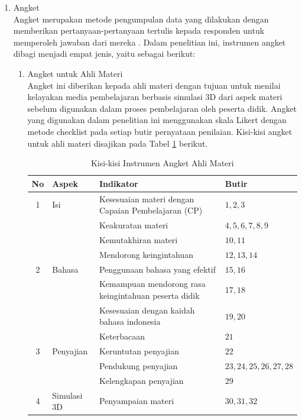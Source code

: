 \begin{enumerate}
\begin{enumerate}
        \item Angket\\
        \hspace*{1cm}Angket merupakan metode pengumpulan data yang dilakukan dengan memberikan pertanyaan-pertanyaan tertulis kepada responden untuk memperoleh jawaban dari mereka \citep{sugiyono2018}. Dalam penelitian ini, instrumen angket dibagi menjadi empat jenis, yaitu sebagai berikut:
        \begin{enumerate}
            \item Angket untuk Ahli Materi\\
            \hspace*{1cm}Angket ini diberikan kepada ahli materi dengan tujuan untuk menilai kelayakan media pembelajaran berbasis simulasi 3D dari aspek materi sebelum digunakan dalam proses pembelajaran oleh peserta didik. Angket yang digunakan dalam penelitian ini menggunakan skala Likert dengan metode checklist pada setiap butir pernyataan penilaian. Kisi-kisi angket untuk ahli materi disajikan pada Tabel \ref{kisiahlimateri} berikut.
            \begin{table}[H]
                \centering
                \caption{Kisi-kisi Instrumen Angket Ahli Materi}
                \label{kisiahlimateri}
                \begin{tabular}{|c|p{2.5cm}|p{6cm}|p{3.5cm}|}
                    \hline
                    \textbf{No} & \textbf{Aspek} & \textbf{Indikator} & \textbf{Butir}\\
                    \hline
                    1 & Isi & Kesesuaian materi dengan Capaian Pembelajaran (CP) & \(1,2,3\)\\
                    & & Keakuratan materi & \(4,5,6,7,8,9\)\\
                    & & Kemutakhiran materi & \(10,11\)\\
                    & & Mendorong keingintahuan & \(12,13,14\)\\
                    \hline
                    2 & Bahasa & Penggunaan bahasa yang efektif & \(15,16\)\\
                    & & Kemampuan mendorong rasa keingintahuan peserta didik & \(17,18\)\\
                    & & Kesesuaian dengan kaidah bahasa indonesia & \(19,20\)\\
                    & & Keterbacaan & \(21\)\\
                    \hline
                    3 & Penyajian & Keruntutan penyajian & \(22\)\\
                    & & Pendukung penyajian & \(23,24,25,26,27,28\)\\
                    & & Kelengkapan penyajian & \(29\)\\
                    \hline
                    4 & Simulasi 3D & Penyampaian materi & \(30,31,32\)\\
                    \hline
                    


\end{tabular}
\end{table}
\end{enumerate}
\end{enumerate}
\end{enumerate}
